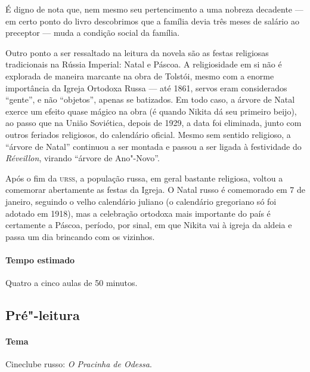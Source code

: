 \documentclass[11pt]{extarticle}
\begin{document}
É digno de nota que, nem mesmo seu pertencimento a uma nobreza
decadente --- em certo ponto do livro descobrimos que a família devia
três meses de salário ao preceptor --- muda a condição social da
família.

Outro ponto a ser ressaltado na leitura da novela são as festas
religiosas tradicionais na Rússia Imperial: Natal e Páscoa. A
religiosidade em si não é explorada de maneira marcante na obra de
Tolstói, mesmo com a enorme importância da Igreja Ortodoxa Russa --- até
1861, servos eram considerados ``gente'', e não ``objetos'', apenas se
batizados. Em todo caso, a árvore de Natal exerce um efeito quase mágico
na obra (é quando Nikita dá seu primeiro beijo), ao passo que na União
Soviética, depois de 1929, a data foi eliminada, junto com outros
feriados religiosos, do calendário oficial. Mesmo sem sentido religioso,
a ``árvore de Natal'' continuou a ser montada e passou a ser ligada à
festividade do \emph{Réveillon}, virando ``árvore de Ano"-Novo''.



Após o fim da \textsc{urss}, a população russa, em geral bastante religiosa,
voltou a comemorar abertamente as festas da Igreja. O Natal russo é
comemorado em 7 de janeiro, seguindo o velho calendário juliano (o
calendário gregoriano só foi adotado em 1918), mas a celebração ortodoxa
mais importante do país é certamente a Páscoa, período, por sinal, em
que Nikita vai à igreja da aldeia e passa um dia brincando com os
vizinhos.

\paragraph{Tempo estimado} Quatro a cinco aulas de 50 minutos.

\subsection{Pré"-leitura}

\paragraph{Tema} Cineclube russo: \emph{O Pracinha de Odessa}.
\end{document}
